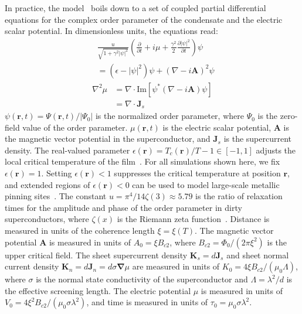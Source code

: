 \documentclass[%
 reprint,
 superscriptaddress,
 amsmath,
 amssymb,
 amsfonts,
 aps,
 prb,
]{revtex4-2}
\renewcommand{\vec}{\mathbf}
\begin{document}
In practice, the model~\cite{Kramer1978-kb,Watts-Tobin1981-mn} boils down to a set of coupled partial differential equations for the complex order parameter of the condensate and the electric scalar potential. In dimensionless units, the equations read:
\begin{equation}
    \label{eq:tdgl-psi}
    \begin{split}
    &\frac{u}{\sqrt{1+\gamma^2|\psi|^2}}\left(\frac{\partial}{\partial t} + i\mu + \frac{\gamma^2}{2}\frac{\partial |\psi|^2}{\partial t}\right)\psi\\
    &=\left(\epsilon-|\psi|^2\right)\psi + (\nabla-i\vec{A})^2\psi
    \end{split}
\end{equation}
\begin{equation}
    \label{tdgl-poisson}
    \begin{split}
        \nabla^2\mu &= \nabla\cdot\mathrm{Im}[\psi^*(\nabla-i\mathbf{A})\psi]\\
        &=\nabla\cdot\mathbf{J}_s
    \end{split}
\end{equation}
$\psi(\mathbf{r}, t)=\Psi(\mathbf{r}, t)/|\Psi_0|$ is the normalized order parameter, where $\Psi_0$ is the zero-field value of the order parameter. $\mu(\mathbf{r}, t)$ is the electric scalar potential, $\mathbf{A}$ is the magnetic vector potential in the superconductor, and $\mathbf{J}_s$ is the supercurrent density. The real-valued parameter $\epsilon(\mathbf{r})=T_c(\mathbf{r})/T - 1 \in [-1,1]$ adjusts the local critical temperature of the film~\cite{Kwok2016-of,Al_Luhaibi2022-cl,Sadovskyy2015-ha}. For all simulations shown here, we fix $\epsilon(\mathbf{r})=1$. Setting $\epsilon(\mathbf{r}) < 1$ suppresses the critical temperature at position $\mathbf{r}$, and extended regions of $\epsilon(\mathbf{r}) < 0$ can be used to model large-scale metallic pinning sites~\cite{Kwok2016-of}. The constant $u=\pi^4/14\zeta(3)\approx5.79$ is the ratio of relaxation times for the amplitude and phase of the order parameter in dirty superconductors, where $\zeta(x)$ is the Riemann zeta function~\cite{Kopnin2001-ip}. Distance is measured in units of the coherence length $\xi=\xi(T)$. The magnetic vector potential $\mathbf{A}$ is measured in units of $A_0=\xi B_{c2}$, where $B_{c2}=\Phi_0/(2\pi\xi^2)$ is the upper critical field. The sheet supercurrent density $\vec{K}_s=d\vec{J}_s$ and sheet normal current density $\vec{K}_n=d\mathbf{J}_n=d\sigma\vec{\nabla}\mu$ are measured in units of $K_0=4\xi B_{c2}/(\mu_0\Lambda)$, where $\sigma$ is the normal state conductivity of the superconductor and $\Lambda=\lambda^2/d$ is the effective screening length. The electric potential $\mu$ is measured in units of 
$V_0=4\xi^2 B_{c2}/(\mu_0\sigma\lambda^2)$, and time is measured in units of $\tau_0=\mu_0\sigma\lambda^2$.
\end{document}

